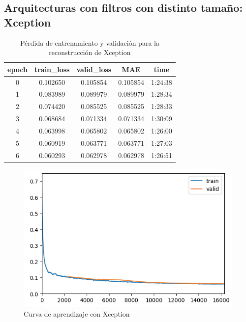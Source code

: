 \subsection{Arquitecturas con filtros con distinto tamaño: Xception}

\begin{table}[H]
	\centering
	\begin{tabular}{|c|c|c|c|c|}
		\hline
		epoch & train\_loss & valid\_loss & MAE & time \\ \hline
		0 & 0.102650 & 0.105854 & 0.105854 & 1:24:38 \\ \hline
		1 & 0.083989 & 0.089979 & 0.089979 & 1:28:34 \\ \hline
		2 & 0.074420 & 0.085525 & 0.085525 & 1:28:33 \\ \hline
		3 & 0.068684 & 0.071334 & 0.071334 & 1:30:09 \\ \hline
		4 & 0.063998 & 0.065802 & 0.065802 & 1:26:00 \\ \hline
		5 & 0.060919 & 0.063771 & 0.063771 & 1:27:03 \\ \hline
		6 & 0.060293 & 0.062978 & 0.062978 & 1:26:51 \\ \hline
	\end{tabular}
	\caption{Pérdida de entrenamiento y validación para la reconstrucción de Xception}
	\label{tabla:resultados}
\end{table}

\begin{figure}[H]
	\centering
	\includegraphics[width=0.8\linewidth]{imagenes/curva_xception.png}
	\caption{Curva de aprendizaje con Xception}
\end{figure}

